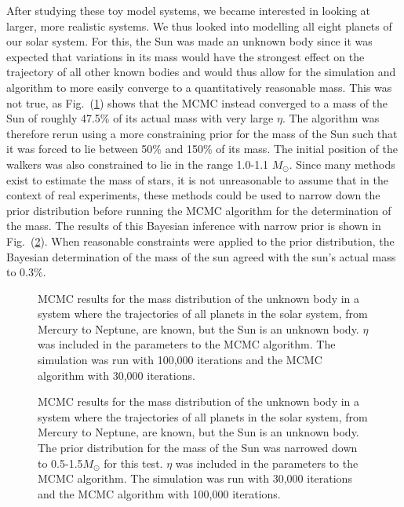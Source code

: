 \documentclass[twocolumn]{aastex63}
\newcommand{\msun}{M_\odot}
\begin{document}
After studying these toy model systems, we became interested in looking at larger, more realistic systems. We thus looked into modelling all eight planets of our solar system. For this, the Sun was made an unknown body since it was expected that variations in its mass would have the strongest effect on the trajectory of all other known bodies and would thus allow for the simulation and algorithm to more easily converge to a quantitatively reasonable mass. This was not true, as Fig.~(\ref{fig:sun_from_solar_syst}) shows that the MCMC instead converged to a mass of the Sun of roughly 47.5\% of its actual mass with very large $\eta$. The algorithm was therefore rerun using a more constraining prior for the mass of the Sun such that it was forced to lie between 50\% and 150\% of its mass. The initial position of the walkers was also constrained to lie in the range 1.0-1.1 $\msun$. Since many methods exist to estimate the mass of stars, it is not unreasonable to assume that in the context of real experiments, these methods could be used to narrow down the prior distribution before running the MCMC algorithm for the determination of the mass. The results of this Bayesian inference with narrow prior is shown in Fig.~(\ref{fig:constrained_sun_from_solar_syst}). When reasonable constraints were applied to the prior distribution, the Bayesian determination of the mass of the sun agreed with the sun's actual mass to 0.3\%.

\begin{figure}[ht!]
\caption{MCMC results for the mass distribution of the unknown body in a system where the trajectories of all planets in the solar system, from Mercury to Neptune, are known, but the Sun is an unknown body. $\eta$ was included in the parameters to the MCMC algorithm. The simulation was run with 100,000 iterations and the MCMC algorithm with 30,000 iterations.\label{fig:sun_from_solar_syst}}
\end{figure}

\begin{figure}[ht!]
\caption{MCMC results for the mass distribution of the unknown body in a system where the trajectories of all planets in the solar system, from Mercury to Neptune, are known, but the Sun is an unknown body. The prior distribution for the mass of the Sun was narrowed down to 0.5-1.5$\msun$ for this test. $\eta$ was included in the parameters to the MCMC algorithm. The simulation was run with 30,000 iterations and the MCMC algorithm with 100,000 iterations.\label{fig:constrained_sun_from_solar_syst}}
\end{figure}
\end{document}
